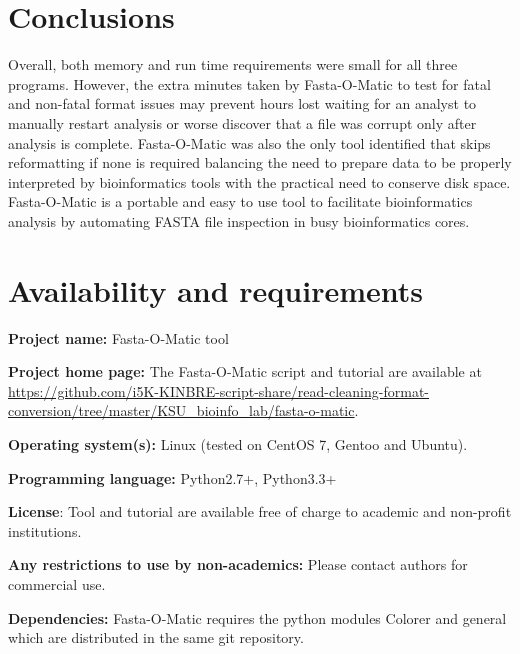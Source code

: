 \documentclass{bmcart}
\begin{document}
\section{Conclusions}
Overall, both memory and run time requirements were small for all three programs. However, the extra minutes taken by Fasta-O-Matic to test for fatal and non-fatal format issues may prevent hours lost waiting for an analyst to manually restart analysis or worse discover that a file was corrupt only after analysis is complete. Fasta-O-Matic was also the only tool identified that skips reformatting if none is required balancing the need to prepare data to be properly interpreted by bioinformatics tools with the practical need to conserve disk space. Fasta-O-Matic is a portable and easy to use tool to facilitate bioinformatics analysis by automating FASTA file inspection in busy bioinformatics cores.
  

\section{Availability and requirements}
\textbf{Project name:} Fasta-O-Matic tool

\textbf{Project home page:} The Fasta-O-Matic script and tutorial are available at \url{https://github.com/i5K-KINBRE-script-share/read-cleaning-format-conversion/tree/master/KSU\_bioinfo\_lab/fasta-o-matic}. 

\textbf{Operating system(s):} Linux (tested on CentOS 7, Gentoo and Ubuntu).

\textbf{Programming language:} Python2.7+, Python3.3+

\textbf{License}: Tool and tutorial are available free of charge to academic and non-profit institutions.

\textbf{Any restrictions to use by non-academics:} Please contact authors for commercial use.

\textbf{Dependencies:} Fasta-O-Matic requires the python modules Colorer and general which are distributed in the same git repository.


\end{document}
